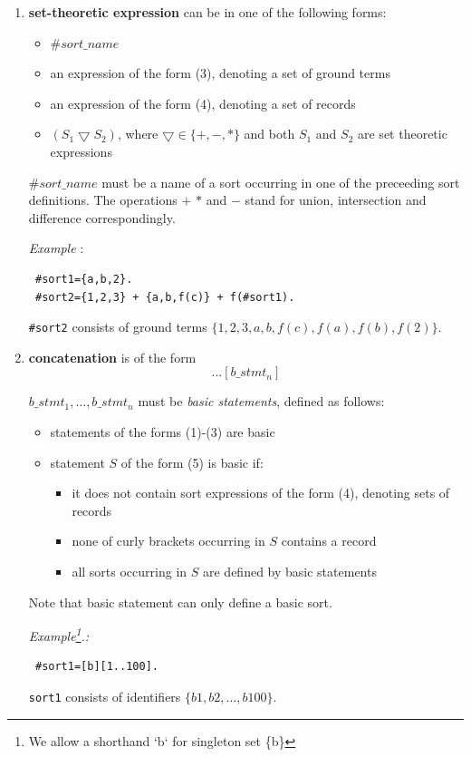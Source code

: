 \documentclass[12pt, letterpaper]{article}
\begin{document}
\begin{enumerate}
 \item \textbf{set-theoretic expression} can be in one of the following forms:
\begin{itemize}
\item $\#sort\_name$  
\item an expression of the form (3), denoting a set of ground terms
\item an expression of the form (4), denoting a set of records
\item $(S_1 \bigtriangledown S_2)$, where $\bigtriangledown \in \{+,-,*\}$ and both $S_1$ and $S_2$ are set theoretic expressions
\end{itemize}

$\#sort\_name$ must be a name of a sort occurring in one of the preceeding sort definitions. 
The operations $+$ $*$ and $-$ stand for union, intersection and difference correspondingly.


\textit{Example} : 
\begin{verbatim}
 #sort1={a,b,2}.
 #sort2={1,2,3} + {a,b,f(c)} + f(#sort1).
\end{verbatim}
 \texttt{\#sort2} consists of ground terms $\{1,2,3,a,b,f(c),f(a),f(b),f(2)\}$.
\item \textbf{concatenation} is of the form
\begin{equation*}
 [b\_stmt_1] ... [b\_stmt_n]
\end{equation*}

$b\_stmt_1, \dots, b\_stmt_n$ must be \textit{basic statements}, defined as follows:


\begin{itemize}
 \item statements of the forms (1)-(3) are basic
 \item statement $S$ of the form (5) is basic if:
 \begin{itemize}
 \item it does not contain sort expressions of the form (4), denoting sets of records
  \item none of curly brackets occurring in $S$ contains a record
  \item all sorts occurring in $S$ are defined by basic statements 
 \end{itemize}
\end{itemize}
Note that basic statement can only define a basic sort.

\textit{Example\footnote{We allow a shorthand `b` for singleton  set \{b\}}.:}

\begin{verbatim}
 #sort1=[b][1..100].
\end{verbatim}

\texttt{sort1} consists of identifiers $\{b1,b2,\dots, b100\}$.

\end{enumerate}
\end{document}
